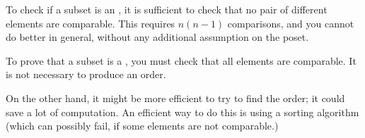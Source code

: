 
\begin{hint}
    To check if a subset is an , it is sufficient to check that no pair of different elements are comparable.
    This requires $n(n-1)$ comparisons, and you cannot do better in general, without any additional assumption on the poset.
\end{hint}

\begin{hint}
    To prove that a subset is a , you must check that all elements are comparable.
    It is not necessary to produce an order.
\end{hint}
\begin{hint}
    On the other hand, it might be more efficient to try to find the   order; it could save a lot of computation.
    An efficient way to do this is using a sorting algorithm (which can possibly fail, if some elements are not comparable.)
\end{hint}
